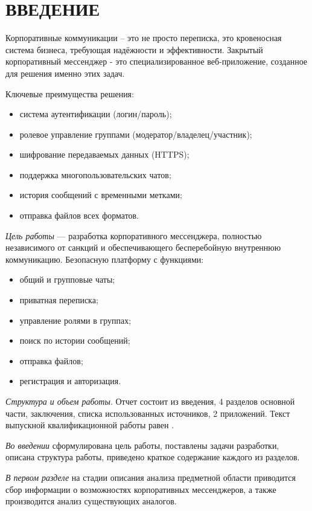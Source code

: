 \section*{ВВЕДЕНИЕ}

Корпоративные коммуникации -- это не просто переписка, это кровеносная система бизнеса, требующая надёжности и эффективности. Закрытый корпоративный мессенджер - это специализированное веб-приложение, созданное для решения именно этих задач. 

Ключевые преимущества решения:
\begin{itemize}
	\item система аутентификации (логин/пароль);
	\item ролевое управление группами (модератор/владелец/участник);
	\item шифрование передаваемых данных (HTTPS);
	\item поддержка многопользовательских чатов;
	\item история сообщений с временными метками;
	\item отправка файлов всех форматов.
\end{itemize}

\emph{Цель работы} — разработка корпоративного мессенджера, полностью независимого от санкций и обеспечивающего бесперебойную внутреннюю коммуникацию. Безопасную платформу с функциями:
\begin{itemize}
	\item общий и групповые чаты;
	\item приватная переписка;
	\item управление ролями в группах;
	\item поиск по истории сообщений;
	\item отправка файлов;
	\item регистрация и авторизация.
\end{itemize}

\textit{Структура и объем работы}. Отчет состоит из введения, 4 разделов основной части, заключения, списка использованных источников, 2 приложений. Текст выпускной квалификационной работы равен .

\textit{Во введении} сформулирована цель работы, поставлены задачи разработки, описана структура работы, приведено краткое содержание каждого из разделов.

\textit{В первом разделе} на стадии описания анализа предметной области приводится сбор информации о возможностях корпоративных мессенджеров, а также производится анализ существующих аналогов.

